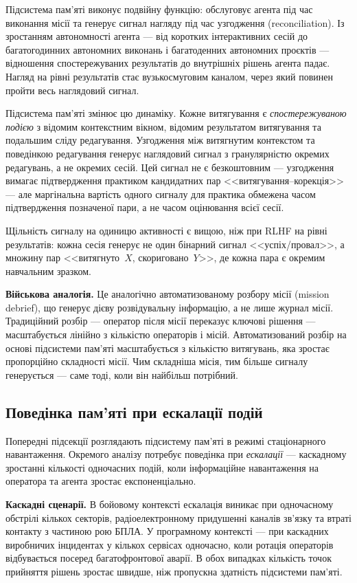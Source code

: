 Підсистема пам'яті виконує подвійну функцію: обслуговує агента під час виконання місії та генерує сигнал нагляду під час узгодження (reconciliation).
Із зростанням автономності агента --- від коротких інтерактивних сесій до багатогодинних автономних виконань і багатоденних автономних проєктів --- відношення спостережуваних результатів до внутрішніх рішень агента падає.
Нагляд на рівні результатів стає вузькосмуговим каналом, через який повинен пройти весь наглядовий сигнал.

Підсистема пам'яті змінює цю динаміку.
Кожне витягування є \emph{спостережуваною подією} з відомим контекстним вікном, відомим результатом витягування та подальшим сліду редагування.
Узгодження між витягнутим контекстом та поведінкою редагування генерує наглядовий сигнал з гранулярністю окремих редагувань, а не окремих сесій.
Цей сигнал не є безкоштовним --- узгодження вимагає підтвердження практиком кандидатних пар <<витягування--корекція>> --- але маргінальна вартість одного сигналу для практика обмежена часом підтвердження позначеної пари, а не часом оцінювання всієї сесії.

Щільність сигналу на одиницю активності є вищою, ніж при RLHF на рівні результатів: кожна сесія генерує не один бінарний сигнал <<успіх/провал>>, а множину пар <<витягнуто~$X$, скориговано~$Y$>>, де кожна пара є окремим навчальним зразком.

\textbf{Військова аналогія.}
Це аналогічно автоматизованому розбору місії (mission debrief), що генерує дієву розвідувальну інформацію, а не лише журнал місії.
Традиційний розбір --- оператор після місії переказує ключові рішення --- масштабується лінійно з кількістю операторів і місій.
Автоматизований розбір на основі підсистеми пам'яті масштабується з кількістю витягувань, яка зростає пропорційно складності місії.
Чим складніша місія, тим більше сигналу генерується --- саме тоді, коли він найбільш потрібний.


\subsection{Поведінка пам'яті при ескалації подій}
\label{sec:disc-escalation}

Попередні підсекції розглядають підсистему пам'яті в режимі стаціонарного навантаження.
Окремого аналізу потребує поведінка при \emph{ескалації} --- каскадному зростанні кількості одночасних подій, коли інформаційне навантаження на оператора та агента зростає експоненціально.

\textbf{Каскадні сценарії.}
В бойовому контексті ескалація виникає при одночасному обстрілі кількох секторів, радіоелектронному придушенні каналів зв'язку та втраті контакту з частиною рою БПЛА.
У програмному контексті --- при каскадних виробничих інцидентах у кількох сервісах одночасно, коли ротація операторів відбувається посеред багатофронтової аварії.
В обох випадках кількість точок прийняття рішень зростає швидше, ніж пропускна здатність підсистеми пам'яті.

